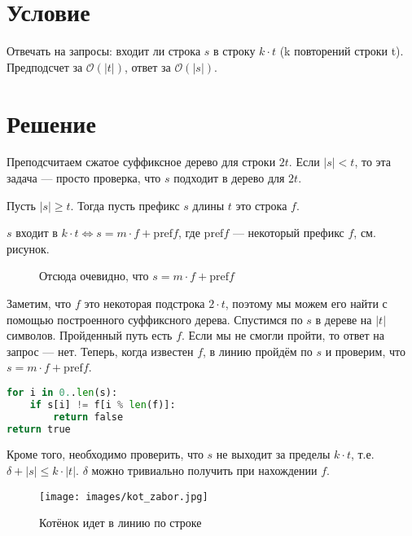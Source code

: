 

\usepackage{svg}
\usepackage{listings}

\lstset{basicstyle=\ttfamily,breaklines=true}

\setmonofont{Inconsolata}

\cfoot{}



\section*{Условие}

Отвечать на запросы: входит ли строка \(s\) в строку \(k\cdot t\) (k повторений строки t). Предподсчет за \(\mathcal{O}(|t|)\), ответ за \(\mathcal{O}(|s|)\).

\section*{Решение}

Преподсчитаем сжатое суффиксное дерево для строки \(2t\). Если \(|s| < t\), то эта задача --- просто проверка, что \(s\) подходит в дерево для \(2t\).

Пусть \(|s| \ge t\). Тогда пусть префикс \(s\) длины \(t\) это строка \(f\).

\(s\) входит в \(k\cdot t \iff s = m\cdot f + \text{pref}f\), где \(\text{pref}f\) --- некоторый префикс \(f\), см. рисунок.

\begin{figure}[h]
    \centering
    
    \caption{Отсюда очевидно, что \(s = m\cdot f + \text{pref} f\)}
\end{figure}

Заметим, что \(f\) это некоторая подстрока \(2\cdot t\), поэтому мы можем его найти с помощью построенного суффиксного дерева. Спустимся по \(s\) в дереве на \(|t|\) символов. Пройденный путь есть \(f\). Если мы не смогли пройти, то ответ на запрос --- нет. Теперь, когда известен \(f\), в линию пройдём по \(s\) и проверим, что \(s = m\cdot f + \text{pref} f\).

\begin{lstlisting}[language=Python]
for i in 0..len(s):
    if s[i] != f[i % len(f)]:
        return false
return true
\end{lstlisting}

Кроме того, необходимо проверить, что \(s\) не выходит за пределы \(k\cdot t\), т.е. \(\delta + |s| \le k\cdot |t|\). \(\delta\) можно тривиально получить при нахождении \(f\).

\begin{figure}[h]
    \texttt{[image: images/kot\_zabor.jpg]}
    \centering
    \caption{Котёнок идет в линию по строке}
\end{figure}


